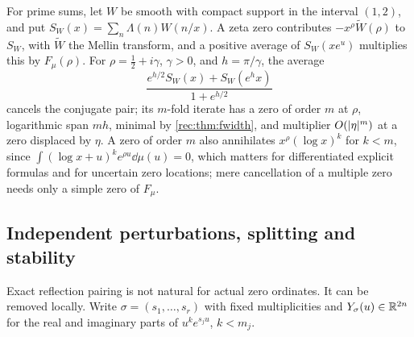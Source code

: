 For prime sums, let $W$ be smooth with compact support in the interval $(1,2)$, and put
$S_W(x)=\sum_n\Lambda(n)W(n/x)$. A zeta zero contributes $-x^\rho\widetilde W(\rho)$ to $S_W$, with
$\widetilde W$ the Mellin transform, and a positive average of $S_W(xe^u)$ multiplies this by
$F_\mu(\rho)$. For $\rho=\tfrac12+i\gamma$, $\gamma>0$, and $h=\pi/\gamma$, the average
\[
 \frac{e^{h/2}S_W(x)+S_W(e^hx)}{1+e^{h/2}}
\]
cancels the conjugate pair; its $m$-fold iterate has a zero of order $m$ at $\rho$, logarithmic span
$mh$, minimal by \cref{rec:thm:fwidth}, and multiplier $O(\lvert\eta\rvert^m)$ at a zero displaced by $\eta$.
A zero of order $m$ also annihilates $x^\rho(\log x)^k$ for $k<m$, since
$\int(\log x+u)^ke^{\rho u}\dd\mu(u)=0$, which matters for differentiated explicit formulas and for
uncertain zero locations; mere cancellation of a multiple zero needs only a simple zero of $F_\mu$.

\subsection{Independent perturbations, splitting and stability}\label{fil:sec:perturb}

Exact reflection pairing is not natural for actual zero ordinates. It can be removed locally. Write
$\sigma=(s_1,\dots,s_r)$ with fixed multiplicities and $Y_\sigma(u)\in\mathbb{R}^{2n}$ for the real and
imaginary parts of $u^ke^{s_ju}$, $k<m_j$.


